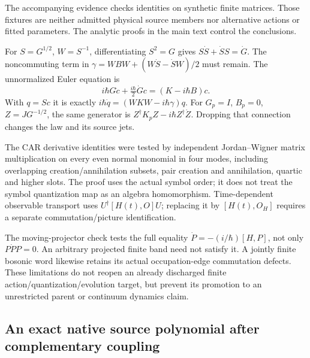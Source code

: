 \documentclass[12pt,a4paper]{article}
\begin{document}
The accompanying evidence checks identities on synthetic finite matrices.
Those fixtures are neither admitted physical source members nor alternative
actions or fitted parameters.  The analytic proofs in the main text control
the conclusions.

For \(S=G^{1/2}\), \(W=S^{-1}\), differentiating \(S^2=G\) gives
\(S\dot S+\dot SS=\dot G\).  The noncommuting term in
\(\gamma=WBW+(W\dot S-\dot SW)/2\) must remain.  The unnormalized
Euler equation is
\[
 i\hbar G\dot c+\tfrac{i\hbar}{2}\dot Gc=(K-i\hbar B)c.
\]
With \(q=Sc\) it is exactly \(i\hbar\dot q=(WKW-i\hbar\gamma)q\).
For \(G_p=I\), \(B_p=0\), \(Z=JG^{-1/2}\), the same generator is
\(Z^\dagger K_pZ-i\hbar Z^\dagger\dot Z\).  Dropping that connection
changes the law and its source jets.

The CAR derivative identities were tested by independent Jordan--Wigner
matrix multiplication on every even normal monomial in four modes,
including overlapping creation/annihilation subsets, pair creation and
annihilation, quartic and higher slots.  The proof uses the actual symbol
order; it does not treat the symbol quantization map as an algebra
homomorphism.  Time-dependent observable transport uses
\(U^\dagger[H(t),O]U\); replacing it by \([H(t),O_H]\) requires a
separate commutation/picture identification.

The moving-projector check tests the full equality
\(\dot P=-(i/\hbar)[H,P]\), not only \(P\dot P P=0\).
An arbitrary projected finite band need not satisfy it.  A jointly
finite bosonic word likewise retains its actual occupation-edge
commutation defects.  These limitations do not reopen an already
discharged finite action/quantization/evolution target, but prevent its
promotion to an unrestricted parent or continuum dynamics claim.





\subsection{An exact native source polynomial after complementary coupling}
\label{p4:sec:native-source-comparison-support}
\end{document}
